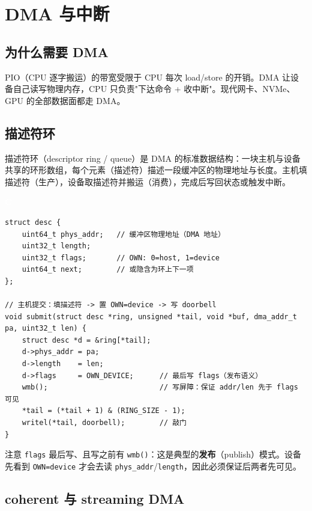 \documentclass[12pt,a4paper,fontset=fandol]{ctexbook}
\newcommand{\clabel}{%
  \begin{tcolorbox}[enhanced,colback=cheadbg,colframe=cheadbg,
    arc=1mm,boxrule=0mm,left=6pt,right=6pt,top=2pt,bottom=2pt,
    halign=left,oversize]
    \textcolor{white}{\small\bfseries C}
  \end{tcolorbox}\vspace{-4pt}}
\newcommand{\Fn}[1]{\texttt{#1()}}
\begin{document}
\chapter{DMA 与中断}\label{ch:dma-irq}

\section{为什么需要 DMA}\label{sec:why-dma}

PIO（CPU 逐字搬运）的带宽受限于 CPU 每次 load/store 的开销。DMA 让设备自己读写物理内存，CPU 只负责"下达命令 + 收中断"。现代网卡、NVMe、GPU 的全部数据面都走 DMA。

\section{描述符环}\label{sec:desc-ring}

描述符环（descriptor ring / queue）是 DMA 的标准数据结构：一块主机与设备共享的环形数组，每个元素（描述符）描述一段缓冲区的物理地址与长度。主机填描述符（生产），设备取描述符并搬运（消费），完成后写回状态或触发中断。

\clabel
\begin{lstlisting}[style=cstyle]
struct desc {
    uint64_t phys_addr;   // 缓冲区物理地址（DMA 地址）
    uint32_t length;
    uint32_t flags;       // OWN: 0=host, 1=device
    uint64_t next;        // 或隐含为环上下一项
};

// 主机提交：填描述符 -> 置 OWN=device -> 写 doorbell
void submit(struct desc *ring, unsigned *tail, void *buf, dma_addr_t pa, uint32_t len) {
    struct desc *d = &ring[*tail];
    d->phys_addr = pa;
    d->length    = len;
    d->flags     = OWN_DEVICE;      // 最后写 flags（发布语义）
    wmb();                          // 写屏障：保证 addr/len 先于 flags 可见
    *tail = (*tail + 1) & (RING_SIZE - 1);
    writel(*tail, doorbell);        // 敲门
}
\end{lstlisting}

注意 \texttt{flags} 最后写、且写之前有 \Fn{wmb}：这是典型的\textbf{发布}（publish）模式。设备先看到 \texttt{OWN=device} 才会去读 \texttt{phys\_addr}/\allowbreak{}\texttt{length}，因此必须保证后两者先可见。

\section{coherent 与 streaming DMA}\label{sec:dma-types}
\end{document}
